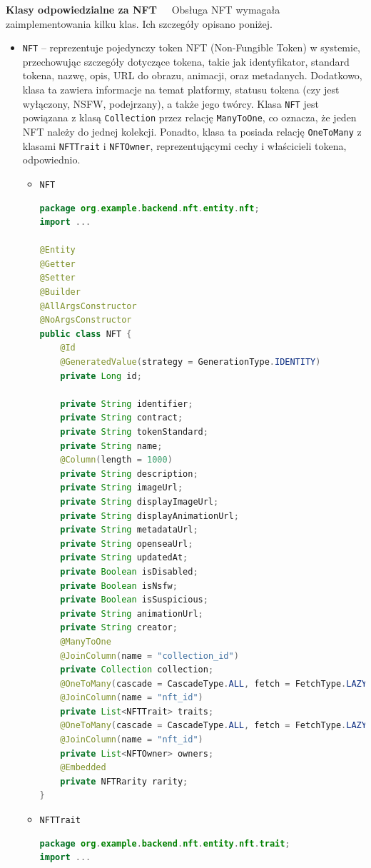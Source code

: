 \noindent \textbf{Klasy odpowiedzialne za NFT~~}
Obsługa NFT wymagała zaimplementowania kilku klas. Ich szczegóły opisano poniżej.
\begin{itemize}
	\item \texttt{NFT} -- reprezentuje pojedynczy token NFT (Non-Fungible Token) w systemie, przechowując szczegóły dotyczące tokena, takie jak identyfikator, standard tokena, nazwę, opis, URL do obrazu, animacji, oraz metadanych. Dodatkowo, klasa ta zawiera informacje na temat platformy, statusu tokena (czy jest wyłączony, NSFW, podejrzany), a także jego twórcy.\newline
Klasa \texttt{NFT} jest powiązana z klasą \texttt{Collection} przez relację \texttt{ManyToOne}, co oznacza, że jeden NFT należy do jednej kolekcji. Ponadto, klasa ta posiada relację \texttt{OneToMany} z klasami \texttt{NFTTrait} i \texttt{NFTOwner}, reprezentującymi cechy i właścicieli tokena, odpowiednio. 
\begin{itemize}
\item \texttt{NFT}
\begin{lstlisting}[language=Java, style=JavaStyle]
package org.example.backend.nft.entity.nft;
import ...

@Entity
@Getter
@Setter
@Builder
@AllArgsConstructor
@NoArgsConstructor
public class NFT {
	@Id
	@GeneratedValue(strategy = GenerationType.IDENTITY)
	private Long id;
	
	private String identifier;
	private String contract;
	private String tokenStandard;
	private String name;
	@Column(length = 1000)
	private String description;
	private String imageUrl;
	private String displayImageUrl;
	private String displayAnimationUrl;
	private String metadataUrl;
	private String openseaUrl;
	private String updatedAt;
	private Boolean isDisabled;
	private Boolean isNsfw;
	private Boolean isSuspicious;
	private String animationUrl;
	private String creator;
	@ManyToOne
	@JoinColumn(name = "collection_id")
	private Collection collection;
	@OneToMany(cascade = CascadeType.ALL, fetch = FetchType.LAZY)
	@JoinColumn(name = "nft_id")
	private List<NFTTrait> traits;
	@OneToMany(cascade = CascadeType.ALL, fetch = FetchType.LAZY)
	@JoinColumn(name = "nft_id")
	private List<NFTOwner> owners;
	@Embedded
	private NFTRarity rarity;
}
\end{lstlisting}

\item \texttt{NFTTrait}
\begin{lstlisting}[language=Java, style=JavaStyle]
package org.example.backend.nft.entity.nft.trait;
import ...


\end{lstlisting}
\end{itemize}
\end{itemize}
